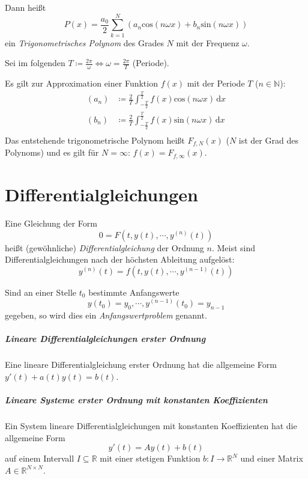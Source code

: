 		Dann heißt \[ P(x) = \frac{a _ 0}{2} \sum _ { k = 1 } ^ N (a _ n \text{cos}(n \omega x) + b _ n \text{sin}(n \omega x)) \] ein \textit{Trigonometrisches Polynom} des Grades $ N $ mit der Frequenz $ \omega $.

		Sei im folgenden $ T \coloneqq \frac{2\pi}{\omega} \iff \omega = \frac{2\pi}{T} $ (Periode).

		Es gilt zur Approximation einer Funktion $ f(x) $ mit der Periode $ T $ ($ n \in \mathbb{N} $):
		\begin{align*}
			(a _ n) & \coloneqq \frac{2}{T} \int _ { - \frac{T}{2} } ^ \frac{T}{2} \! f(x) \text{cos}(n \omega x) \, \mathrm{d}x \\
			(b _ n) & \coloneqq \frac{2}{T} \int _ { - \frac{T}{2} } ^ \frac{T}{2} \! f(x) \text{sin}(n \omega x) \, \mathrm{d}x \\
		\end{align*}
		Das entstehende trigonometrische Polynom heißt $ F _ { f, N } (x) $ ($ N $ ist der Grad des Polynoms) und es gilt für $ N = \infty $: $ f(x) = F _ { f, \infty } (x) $.

\chapter{Differentialgleichungen}
Eine Gleichung der Form \[ 0 = F(t, y(t), \cdots, y ^ {(n)}(t)) \] heißt (gewöhnliche) \textit{Differentialgleichung} der Ordnung $ n $. Meist sind Differentialgleichungen nach der höchsten Ableitung aufgelöst: \[ y ^ {(n)} (t) = f(t, y(t), \cdots, y ^ {(n - 1)} (t)) \]

Sind an einer Stelle $ t _ 0 $ bestimmte Anfangswerte \[ y(t _ 0) = y _ 0, \cdots, y ^ {(n - 1)} (t _ 0) = y _ { n - 1 } \] gegeben, so wird dies ein \textit{Anfangswertproblem} genannt.

\paragraph{Lineare Differentialgleichungen erster Ordnung}
	\label{p:dgllinear}

	Eine lineare Differentialgleichung erster Ordnung hat die allgemeine Form $ y'(t) + a(t)y(t) = b(t) $.

\paragraph{Lineare Systeme erster Ordnung mit konstanten Koeffizienten}
	Ein System lineare Differentialgleichungen mit konstanten Koeffizienten hat die allgemeine Form
	\begin{equation*}
		y'(t) = Ay(t) + b(t)
	\end{equation*}
	auf einem Intervall $ I \subseteq \mathbb{R} $ mit einer stetigen Funktion $ b : I \rightarrow \mathbb{R} ^ N $ und einer Matrix $ A \in \mathbb{R} ^ { N \times N } $.

